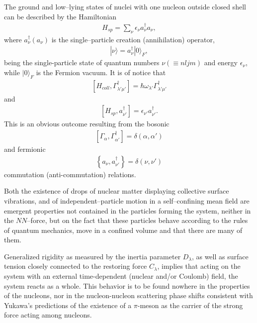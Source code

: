 \documentclass[a4paper,11pt]{book}
\numberwithin{equation}{section}
\numberwithin{figure}{section}
\numberwithin{table}{section}
\newcommand{\ket}[1]{|{#1} \rangle }
\begin{document}
The ground and low--lying states of nuclei with one nucleon outside closed shell can be described by the Hamiltonian
\begin{align}\label{eq1.0.10}
H_{sp}=\sum_{\nu}\epsilon_\nu a_\nu^\dagger a_\nu,
\end{align}
where $a_\nu^\dagger (a_\nu)$ is the single--particle creation (annihilation) operator,
\begin{align}\label{eq1.0.11}
\ket{\nu}=a_\nu^\dagger\ket{0}_F,
\end{align}
being the single-particle state of quantum numbers $\nu(\equiv nljm)$ and energy $\epsilon_\nu$, while $\ket{0}_F$ is the Fermion vacuum. 
It is of notice that
\begin{align}\label{eq0.1.14}
\left[H_{coll},\Gamma^\dagger_{\lambda'\mu'}\right]=\hbar\omega_{\lambda'}\Gamma^\dagger_{\lambda'\mu'}
\end{align}
and 
\begin{align}\label{eq0.1.15}
\left[H_{sp},a^\dagger_{\nu'}\right]=\epsilon_{\nu'}a^\dagger_{\nu'}.
\end{align}
	This is an obvious outcome resulting from the bosonic
\begin{align}\label{eq0.1.16}
\left[\Gamma_{\alpha},\Gamma^\dagger_{\alpha'}\right]=\delta(\alpha,\alpha')
\end{align}
	and fermionic
\begin{align}
\left\{a_\nu,a^\dagger_{\nu'}\right\}=\delta(\nu,\nu')
\end{align}
commutation (anti-commutation) relations.


Both the existence of drops of nuclear matter displaying collective surface vibrations, and of independent--particle motion in a self--confining mean field are emergent properties not contained in the particles forming the system, neither in the $NN$--force, but on the fact that these particles behave according to the rules of quantum mechanics, move in a confined volume and that there are many of them.


Generalized rigidity as measured by the inertia parameter $D_\lambda$, as well as surface tension closely connected to the restoring force $C_\lambda$, implies that acting on the system with an external time-dependent (nuclear and/or Coulomb) field, the system reacts as a whole. This behavior is to be found nowhere in the properties of the nucleons, nor in the nucleon-nucleon scattering phase shifts consistent with Yukawa's predictions of the existence of a $\pi$-meson as the carrier of the strong force acting among nucleons.
\end{document}
